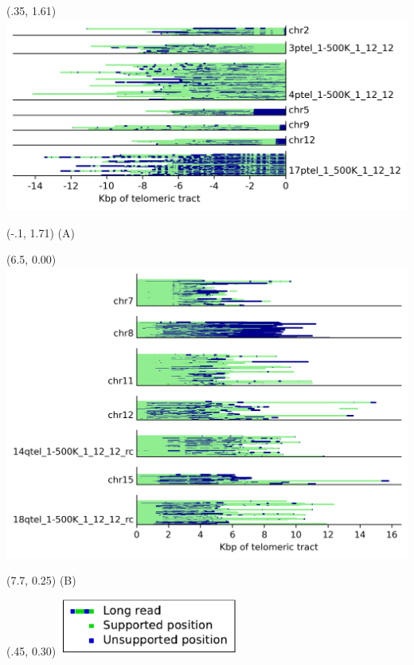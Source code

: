 \documentclass{article}
\begin{document}
\begin{textblock}{13}(.35,  1.61) \includegraphics{Figure_S1/p_arm-support.png}   \end{textblock}
\begin{textblock}{13}(-.1,  1.71) \LARGE{(A)} \end{textblock}

\begin{textblock}{13}(6.5,  0.00) \includegraphics{Figure_S1/q_arm-support.png}   \end{textblock}
\begin{textblock}{13}(7.7,  0.25) \LARGE{(B)} \end{textblock}

\begin{textblock}{13}(.45,  0.30) \includegraphics[width=2.300in,keepaspectratio]{Figure_S1/support-legend.pdf}   \end{textblock}
\end{document}
